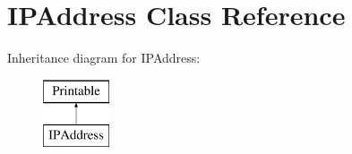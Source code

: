 \hypertarget{class_i_p_address}{}\section{I\+P\+Address Class Reference}
\label{class_i_p_address}
Inheritance diagram for I\+P\+Address\+:\begin{figure}[H]
\begin{center}
\leavevmode
\includegraphics[height=2.000000cm]{class_i_p_address}
\end{center}
\end{figure}
